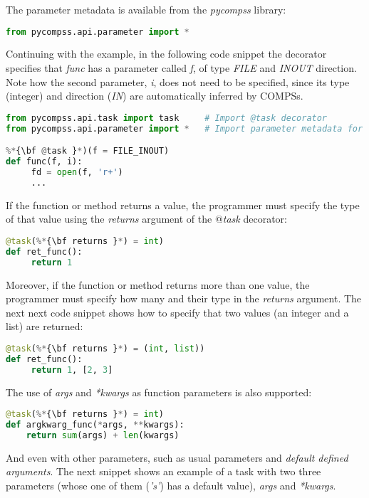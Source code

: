 The parameter metadata is available from the {\it pycompss} library:

\begin{lstlisting}[language=python]
from pycompss.api.parameter import *
\end{lstlisting}
 
Continuing with the example, in the following code snippet the decorator specifies that {\it func} 
has a parameter called {\it f}, of type {\it FILE} and {\it INOUT} direction. Note how the second 
parameter, {\it i}, does not need to be specified, since its type (integer) and direction ({\it IN}) 
are automatically inferred by COMPSs.

\begin{lstlisting}[language=python]
from pycompss.api.task import task     # Import @task decorator
from pycompss.api.parameter import *   # Import parameter metadata for the @task decorator

%*{\bf @task }*)(f = FILE_INOUT)
def func(f, i):
     fd = open(f, 'r+')
     ...
\end{lstlisting}

If the function or method returns a value, the programmer must specify the type of that value using 
the {\it returns} argument of the {\it $@$task} decorator:

\begin{lstlisting}[language=python]
@task(%*{\bf returns }*) = int)
def ret_func():
     return 1
\end{lstlisting}

Moreover, if the function or method returns more than one value, the programmer must specify how many 
and their type in the {\it returns} argument. The next next code snippet shows how to specify that two 
values (an integer and a list) are returned:

\begin{lstlisting}[language=python]
@task(%*{\bf returns }*) = (int, list))
def ret_func():
     return 1, [2, 3]
\end{lstlisting}

The use of {\it *args} and {\it **kwargs} as function parameters is also supported:

\begin{lstlisting}[language=python]
@task(%*{\bf returns }*) = int)
def argkwarg_func(*args, **kwargs):
    return sum(args) + len(kwargs)
\end{lstlisting}

And even with other parameters, such as usual parameters and {\it default defined arguments}. The next 
snippet shows an example of a task with two three parameters (whose one of them ({\it 's'}) has a default
value), {\it *args} and {\it **kwargs}.

